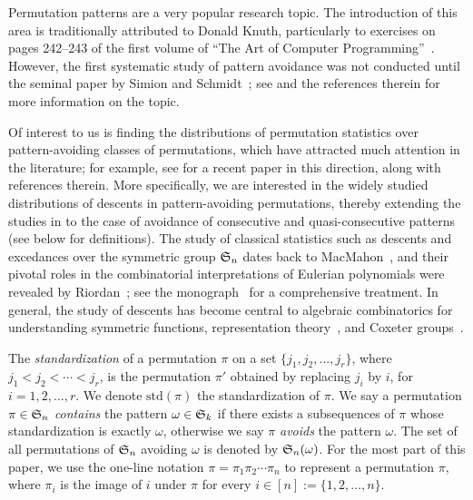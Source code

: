 
Permutation patterns are a very popular research topic. The introduction of this area is traditionally attributed to 
Donald Knuth, particularly to exercises on pages 242--243 of the first volume of ``The Art of Computer Programming''~\cite{knu75}. However, the first
systematic study of pattern avoidance was not conducted until the seminal paper by Simion and Schmidt~\cite{SS85}; see \cite{kit11} and the references therein for more information on the topic. 

Of interest to us is finding the distributions of permutation statistics over pattern-avoiding classes of permutations, which have attracted much attention in the literature; for example, see \cite{HK} for a recent paper in this direction, along with references therein. More specifically, we are interested in the widely studied distributions of descents in pattern-avoiding permutations, thereby extending the studies in \cite{BDGZ19, Bukata2019, HK, MR06} to the case of avoidance of consecutive and quasi-consecutive patterns (see below for definitions). The study of classical statistics such as descents and excedances over the symmetric group $\S_n$ dates back to MacMahon~\cite{mac60}, and their pivotal roles in the combinatorial interpretations of Eulerian polynomials were revealed by Riordan~\cite{rio58}; see the monograph~\cite{FS70} for a comprehensive treatment. In general, the study of descents has become central to algebraic combinatorics for understanding symmetric functions, representation theory~\cite{sag91}, and Coxeter groups~\cite{rei95}.

The \textit{standardization} of a permutation $\pi$ on a set $\{j_1,j_2,\ldots,j_r\}$, where
$j_1<j_2<\cdots<j_r$, is the permutation $\pi'$ obtained by replacing $j_i$ by $i$, for $i=1,2,\ldots,r$. We denote $\mathrm{std}(\pi)$ the standardization of $\pi$. We say a permutation $\pi \in \S_n$ \textit{contains} the pattern $\omega \in \S_k$ if there exists a subsequences of $\pi$ whose standardization is exactly $\omega$, otherwise we say $\pi$ \textit{avoids} the pattern $\omega$.
The set of all permutations of $\S_n$ avoiding $\omega$ is denoted by $\S_n(\omega)$. For the most part of this paper, we use the one-line notation $\pi=\pi_1\pi_2\cdots \pi_n$ to represent a permutation $\pi$, where $\pi_i$ is the image of $i$ under $\pi$ for every $i\in[n]:=\{1,2,\ldots,n\}$.

